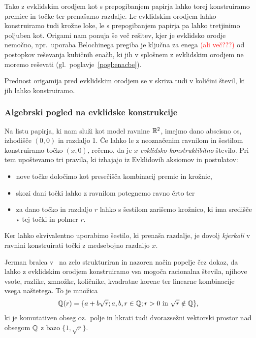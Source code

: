Tako z evklidskim orodjem kot s prepogibanjem papirja lahko torej konstruiramo premice in točke ter prenašamo razdalje. Le evklidskim orodjem lahko konstruiramo tudi krožne loke, le s prepogibanjem papirja pa lahko tretjinimo poljuben kot. Origami nam ponuja še več rešitev, kjer je evklidsko orodje nemočno, npr.\ uporaba Belochinega pregiba je ključna za enega \textcolor{red}{(ali več???)} od postopkov reševanja kubičnih enačb, ki jih v splošnem z evklidskim orodjem ne moremo reševati (gl.\ poglavje~\ref{pogl:enacbe}).

Prednost origamija pred evklidskim orodjem se v skriva tudi v količini števil, ki jih lahko konstruiramo.

\subsubsection{Algebrski pogled na evklidske konstrukcije}

\begin{definicija}
    Na listu papirja, ki nam služi kot model ravnine $\mathbb R^2$, imejmo dano abscisno os, izhodišče $(0,0)$ in razdaljo 1. Če lahko le z neoznačenim ravnilom in šestilom konstruiramo točko $(x,0)$, rečemo, da je $x$ \emph{evklidsko-konstruktibilno} število. Pri tem upoštevamo tri pravila, ki izhajajo iz Evklidovih aksiomov in postulatov:
    \begin{itemize}
        \item nove točke določimo kot presečišča kombinacij premic in krožnic,
        \item skozi dani točki lahko z ravnilom potegnemo ravno črto ter
        \item za dano točko in razdaljo $r$ lahko s šestilom zarišemo krožnico, ki ima središče v tej točki in polmer $r$.
    \end{itemize}
\end{definicija}

\begin{opomba}
    Ker lahko ekvivalentno uporabimo šestilo, ki prenaša razdalje, je dovolj \emph{kjerkoli} v ravnini konstruirati točki z medsebojno razdaljo $x$.
\end{opomba}

Jerman bralca v~\cite{jerman1998} na zelo strukturiran in nazoren način popelje čez dokaz, da lahko z evklidskim orodjem konstruiramo vsa mogoča racionalna števila, njihove vsote, razlike, zmnožke, količnike, kvadratne korene ter linearne kombinacije vsega naštetega. To je množica
$$
    \mathbb Q(r) = \{ a + b \sqrt{r}; a, b, r \in \mathbb Q; r > 0 \text{ in } \sqrt{r} \notin \mathbb Q \},
$$
ki je komutativen obseg oz.\ polje in hkrati tudi dvorazsežni vektorski prostor nad obsegom $\mathbb Q$ z bazo $ \{1, \sqrt{r} \} $.

